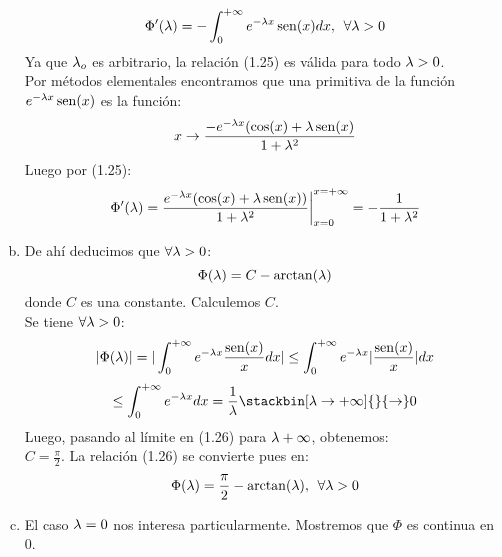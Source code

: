 \begin{enumerate}[a)]
\begin{equation}
\Phi '(\lambda)=-\int_0^{+\infty}e^{-\lambda x}\operatorname{sen} (x)dx, \phantom{s} \forall \lambda>0
\end{equation}
Ya que $\lambda_o$ es arbitrario, la relación (1.25) es válida para todo $\lambda>0$.\\
Por métodos elementales encontramos que una primitiva de la función \x \flecha $e^{- \lambda x}\operatorname{sen} (x)$ es la función:
\begin{equation*}
x\rightarrow \frac{-e^{-\lambda x}(\cos (x)+\lambda \operatorname{sen} (x)}{1+\lambda^2}
\end{equation*}
Luego por (1.25):\\
\begin{equation*}
\left.
\Phi ' (\lambda)=\frac{e^{- \lambda x}(\cos (x)+ \lambda \operatorname{sen} (x))}{1+\lambda^2}\right|_{x=0}^{x=+\infty}=-\frac{1}{1+\lambda^2}
\end{equation*}
\item De ahí deducimos que $\forall \lambda >0$:
\begin{equation}
\Phi (\lambda)=C-\arctan (\lambda)
\end{equation}
donde $C$ es una constante. Calculemos $C$.\\
Se tiene $\forall \lambda >0$:\\
$$|\Phi (\lambda)|=|\int_0^{+\infty}e^{-\lambda x}\frac{\operatorname{sen} (x)}{x}dx| \leq \int_0^{+\infty}e^{-\lambda x}|\frac{\operatorname{sen} (x)}{x}|dx $$
$$\leq \int_0^{+\infty}e^{- \lam x}dx=\frac{1}{\lam} \stackbin[\lam \flecha +\infty]{}{\flecha}0$$
Luego, pasando al límite en (1.26) para $\lambda +\infty$, obtenemos:\\
$C=\frac{\pi}{2}$. La relación (1.26) se convierte pues en:\\
\begin{equation}
\Phi (\lambda) =\frac{\pi}{2}-\arctan (\lambda), \phantom{s} \forall \lambda >0
\end{equation}
\item El caso $\lambda=0$ nos interesa particularmente. Mostremos que $\Phi$ es continua en $0$.
\end{enumerate}
